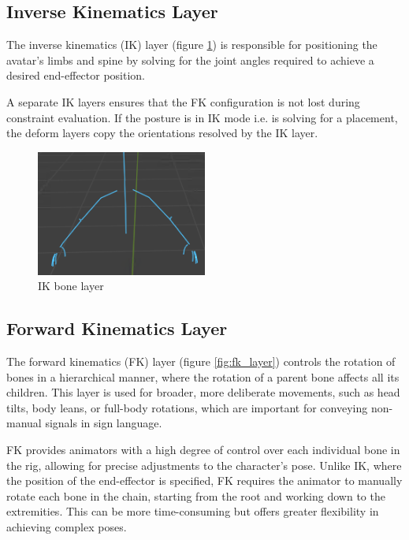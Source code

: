 \documentclass[../../main.tex]{subfiles}
\begin{document}
\subsection{Inverse Kinematics Layer}
\label{ch:rigging_layers:proc_rig_signing_avatars:ik_layer}

The inverse kinematics (IK) layer (figure \ref{fig:ik_layer}) is responsible for positioning the avatar's limbs and spine by solving for the joint angles required to achieve a desired end-effector position.

A separate IK layers ensures that the FK configuration is not lost during constraint evaluation. If the posture is in IK mode i.e. is solving for a placement, the deform layers copy the orientations resolved by the IK layer.

\begin{figure}
    \centering
    \includegraphics[width=0.5\textwidth]{chapters/rigging_layers/images/ik_layer.png}
    \caption{IK bone layer}
    \label{fig:ik_layer}
\end{figure}

\subsection{Forward Kinematics Layer}
\label{ch:rigging_layers:proc_rig_signing_avatars:fk_layer}

The forward kinematics (FK) layer (figure \ref{fig:fk_layer}) controls the rotation of bones in a hierarchical manner, where the rotation of a parent bone affects all its children. This layer is used for broader, more deliberate movements, such as head tilts, body leans, or full-body rotations, which are important for conveying non-manual signals in sign language.

FK provides animators with a high degree of control over each individual bone in the rig, allowing for precise adjustments to the character's pose. Unlike IK, where the position of the end-effector is specified, FK requires the animator to manually rotate each bone in the chain, starting from the root and working down to the extremities. This can be more time-consuming but offers greater flexibility in achieving complex poses.
\end{document}
